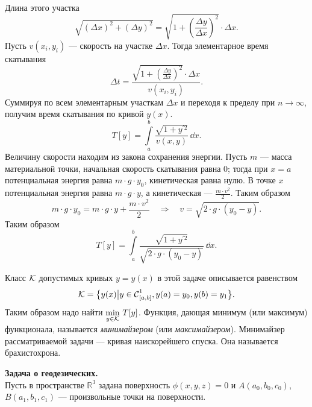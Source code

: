 \begin{enumerate2}
\begin{figure}[H]
\begin{tikzpicture}[x=0.75pt,y=0.75pt,yscale=-1,xscale=1]
		
	\end{tikzpicture}
	\caption{~}
	\label{l1:fig:3}
	\end{figure}
	Длина этого участка
	\begin{equation*}
		\sqrt{(\Delta x)^2+(\Delta y)^2}=\sqrt{1+\left(\frac{\Delta y}{\Delta x}\right)^2}\cdot \Delta x.
	\end{equation*}
	Пусть $v(x_i, y_i)$ --- скорость на участке $\Delta x$. Тогда элементарное время скатывания
	\begin{equation*}
		\Delta t= \displaystyle \frac{\sqrt{1+\left(\frac{\Delta y}{\Delta x}\right)^2}\cdot \Delta x}{v(x_i, y_i)}. 
	\end{equation*}
	Суммируя по всем элементарным участкам $\Delta x$ и переходя к пределу при $n\to\infty$, получим время скатывания по кривой $y(x)$.
	\begin{equation*}
		 T[y]=\int\limits_a^b\frac{\sqrt{1+y^{\prime 2}}}{v(x,y)}\,\dd{x}.
	\end{equation*}
	Величину скорости находим из закона сохранения энергии. Пусть $m$ --- масса материальной точки, начальная скорость скатывания равна 0; тогда при $x=a$ потенциальная энергия равна $m\cdot g\cdot y_0$, кинетическая равна нулю. В точке $x$ потенциальная энергия равна $m\cdot g\cdot y$, а кинетическая --- $\frac{m\cdot v^2}{2}$. Таким образом
	\begin{equation*}
		m\cdot g\cdot y_0=m\cdot g\cdot y+\frac{m\cdot v^2}{2}\quad\Rightarrow \quad v=\sqrt{2\cdot g\cdot(y_0-y)}.
	\end{equation*}
	Таким образом  
	\begin{equation*}
		 T[y]=\int\limits_a^b\frac{\sqrt{1+y^{\prime 2}}}{\sqrt{2\cdot g\cdot(y_0-y)}}\,\dd{x}.
	\end{equation*}
	
	Класс $\mc{K}$ допустимых кривых $y=y(x)$ в этой задаче описывается равенством 	
	\begin{equation*}
		\mc{K}=\big\{y(x)\big|y\in\Cfn[{[a,b]}]{1}, y(a)=y_0, y(b)=y_1\big\}.
	\end{equation*}
	Таким образом надо найти $\min\limits_{y\in\mc{K}}\,T[y]$. Функция, дающая минимум (или максимум) функционала, называется \emph{минимайзером} (или \emph{максимайзером}). Минимайзер рассматриваемой задачи --- кривая наискорейшего спуска. Она называется брахистохрона.
	
	\item \textbf{Задача о геодезических.}\\
	Пусть в пространстве $\mathbb{R}^3$ задана поверхность $\phi(x,y,z)=0$ и $A(a_0,b_0,c_0)$, $B(a_1,b_1,c_1)$ --- произвольные точки на поверхности.
	

\end{enumerate2}
